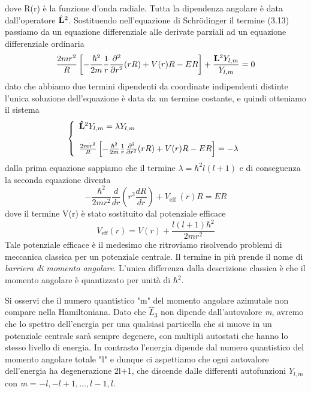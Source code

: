 dove R(r) \`e la funzione d'onda radiale. Tutta la dipendenza angolare \`e data dall'operatore $\hat{\bold{L}}^2$. Sostituendo nell'equazione di Schr\"odinger il termine (3.13) passiamo da un equazione differenziale alle derivate parziali ad un equazione differenziale ordinaria 
\begin{equation*}
	\frac{2mr^2}{R} \left [  - \frac{\hbar^2}{2m} \frac{1}{r} \frac{\partial^2 }{\partial r^2}(rR) + V(r)R -ER\right ] + \frac{\bold{L}^2Y_{l,m}}{Y_{l,m}} = 0
\end{equation*} 
dato che abbiamo due termini dipendenti da coordinate indipendenti distinte l'unica soluzione dell'equazione \`e data da un termine costante, e quindi otteniamo il sistema 
\begin{equation*}
	\left \{ \begin{array}{l}
		\bold{\hat{L}}^2Y_{l,m} = \lambda Y_{l,m} \\[0.4cm]
		\frac{2mr^2}{R} \left [  - \frac{\hbar^2}{2m} \frac{1}{r} \frac{\partial^2 }{\partial r^2}(rR) + V(r)R -ER\right ] = - \lambda
	\end{array}\right.
\end{equation*}
dalla prima equazione sappiamo che il termine $\lambda = \hbar^2l(l+1)$ e di conseguenza la seconda equazione diventa
\begin{equation}
-\frac{\hbar^2}{2 m r^2} \frac{d}{d r}\left(r^2 \frac{d R}{d r}\right)+V_{\text {eff }}(r) R=E R
\end{equation}
dove il termine V(r) \`e stato sostituito dal potenziale efficace 
\begin{equation*}
V_{\mathrm{eff}}(r)=V(r)+\frac{l(l+1) \hbar^2}{2 m r^2}
\end{equation*}
Tale potenziale efficace \`e il medesimo che ritroviamo risolvendo problemi di meccanica classica per un potenziale centrale. Il termine in pi\`u prende il nome di \textit{barriera di momento angolare}. L'unica differenza dalla descrizione classica \`e che il momento angolare \`e quantizzato per unit\`a di $\hbar^2$.

Si osservi che il numero quantistico "m" del momento angolare azimutale non compare nella Hamiltoniana. Dato che $\hat{L}_3$ non dipende dall'autovalore \textit{m}, avremo che lo spettro dell'energia per una qualsiasi particella che si muove in un potenziale centrale sar\`a sempre degenere, con multipli autostati che hanno lo stesso livello di energia. In contrasto l'energia dipende dal numero quantistico del momento angolare totale "l" e dunque ci aspettiamo che ogni autovalore dell'energia ha degenerazione 2l+1, che discende dalle differenti autofunzioni $Y_{l,m}$ con \textit{m} = $-l,-l+1,...,l-1,l$.

